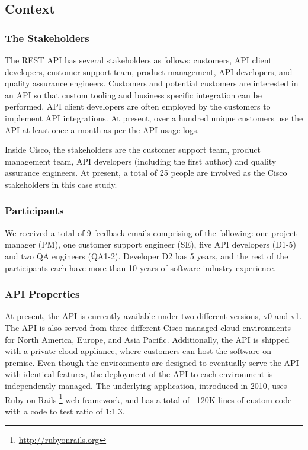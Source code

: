 \subsection{Context}
\subsubsection{The Stakeholders} %
The REST API has several stakeholders as follows: customers, API client developers, customer support team, product management, API developers, and quality assurance engineers. Customers and potential customers are interested in an API so that custom tooling and business specific integration can be performed. API client developers are often employed by the customers to implement API integrations. At present, over a hundred unique customers use the API at least once a month as per the API usage logs.

Inside Cisco, the stakeholders are the customer support team, product management team, API developers (including the first author) and quality assurance engineers. At present, a total of 25 people are involved as the Cisco stakeholders in this case study.

\subsubsection{Participants}
We received a total of 9 feedback emails comprising of the following: one project manager (PM), one customer support engineer (SE), five API developers (D1-5) and two QA engineers (QA1-2). Developer D2 has 5 years, and the rest of the participants each have more than 10 years of software industry experience.

\subsubsection{API Properties} %
At present, the API is currently available under two different versions, v0 and v1. The API is also served from three different Cisco managed cloud environments for North America, Europe, and Asia Pacific. Additionally, the API is shipped with a private cloud appliance, where customers can host the software on-premise. Even though the environments are designed to eventually serve the API with identical features, the deployment of the API to each environment is independently managed. The underlying application, introduced in 2010, uses Ruby on Rails \footnote{\url{http://rubyonrails.org}} web framework, and has a total of ~120K lines of custom code with a code to test ratio of 1:1.3.

